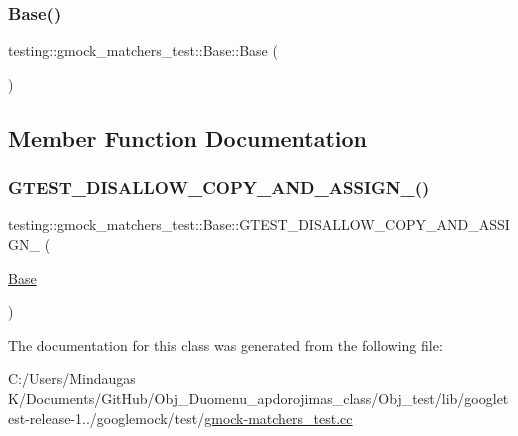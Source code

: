 \mbox{\label{classtesting_1_1gmock__matchers__test_1_1_base_ab3b2127992b81455804462897de44516}} 
\subsubsection{\texorpdfstring{Base()}{Base()}}
{\footnotesize\ttfamily testing\+::gmock\+\_\+matchers\+\_\+test\+::\+Base\+::\+Base (\begin{DoxyParamCaption}{ }\end{DoxyParamCaption})\hspace{0.3cm}{\ttfamily [inline]}}



\subsection{Member Function Documentation}
\mbox{\label{classtesting_1_1gmock__matchers__test_1_1_base_a7b0d0cb9935410e18425968f7135fa91}} 
\subsubsection{\texorpdfstring{GTEST\_DISALLOW\_COPY\_AND\_ASSIGN\_()}{GTEST\_DISALLOW\_COPY\_AND\_ASSIGN\_()}}
{\footnotesize\ttfamily testing\+::gmock\+\_\+matchers\+\_\+test\+::\+Base\+::\+G\+T\+E\+S\+T\+\_\+\+D\+I\+S\+A\+L\+L\+O\+W\+\_\+\+C\+O\+P\+Y\+\_\+\+A\+N\+D\+\_\+\+A\+S\+S\+I\+G\+N\+\_\+ (\begin{DoxyParamCaption}\item[{\mbox{\hyperlink{class_base}{Base}}}]{ }\end{DoxyParamCaption})\hspace{0.3cm}{\ttfamily [private]}}



The documentation for this class was generated from the following file\+:\begin{DoxyCompactItemize}
\item 
C\+:/\+Users/\+Mindaugas K/\+Documents/\+Git\+Hub/\+Obj\+\_\+\+Duomenu\+\_\+apdorojimas\+\_\+class/\+Obj\+\_\+test/lib/googletest-\/release-\/1../googlemock/test/\mbox{\hyperlink{_obj__test_2lib_2googletest-release-1_88_81_2googlemock_2test_2gmock-matchers__test_8cc}{gmock-\/matchers\+\_\+test.\+cc}}\end{DoxyCompactItemize}
